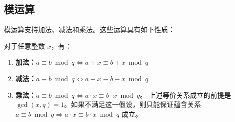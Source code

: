 \subsection{模运算}
\label{subsec:modulo-arithmetic}

模运算支持加法、减法和乘法。这些运算具有如下性质：

\begin{tcolorbox}[title={\textbf{\tboxtheorem{\ref*{subsec:modulo-arithmetic}.1} 模运算的性质}}]
对于任意整数 $x$，有：

\begin{enumerate}
\item \textbf{加法：}$a \equiv b \bmod q \Longleftrightarrow a + x\equiv b + x\bmod q$

\item \textbf{减法：}$a \equiv b \bmod q \Longleftrightarrow a - x\equiv b - x\bmod q$

\item \textbf{乘法：}$a \equiv b \bmod q \Longleftrightarrow a \cdot x \equiv b \cdot x \bmod q$。
上述等价关系成立的前提是 $\gcd(x,q)=1$。如果不满足这一假设，则只能保证蕴含关系 $a \equiv b \bmod q \Rightarrow a \cdot x \equiv b \cdot x \bmod q$ 成立。

\end{enumerate}

\end{tcolorbox}

